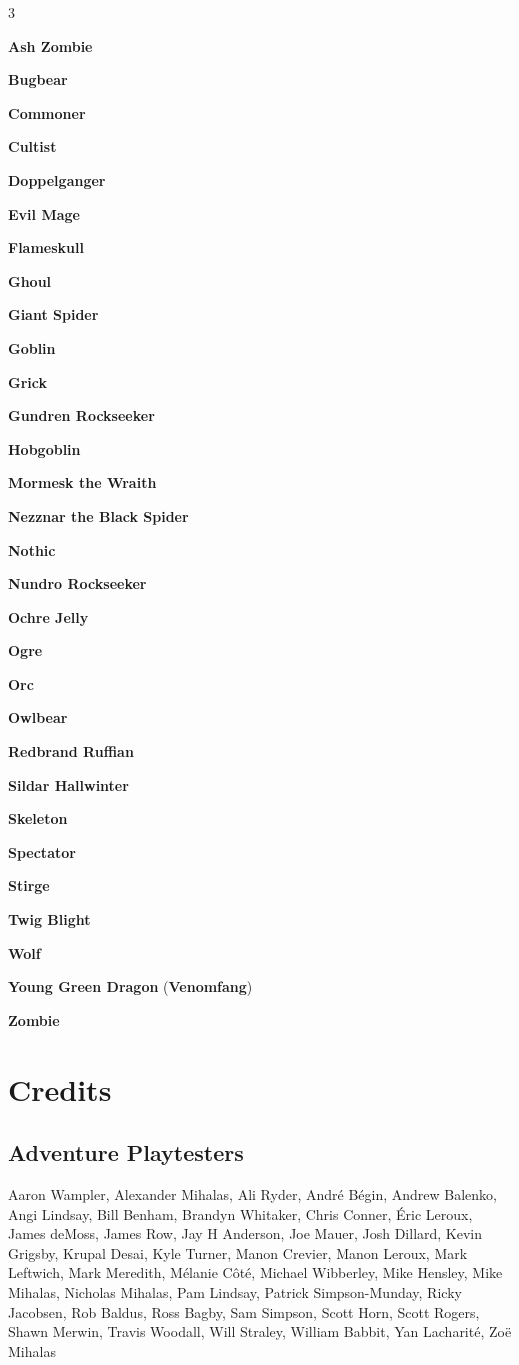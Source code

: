 \documentclass[10pt,a4paper,twoside,bg=print,twocolumn,openany,nodeprecatedcode]{dndbook}
\begin{document}
\begin{itemize}
\begin{multicols}{3}
\item \textbf{Ash Zombie}
\item \textbf{Bugbear}
\item \textbf{Commoner}
\item \textbf{Cultist}
\item \textbf{Doppelganger}
\item \textbf{Evil Mage}
\item \textbf{Flameskull}
\item \textbf{Ghoul}
\item \textbf{Giant Spider}
\item \textbf{Goblin}
\item \textbf{Grick}
\item \textbf{Gundren Rockseeker}
\item \textbf{Hobgoblin}
\item \textbf{Mormesk the Wraith}
\item \textbf{Nezznar the Black Spider}
\item \textbf{Nothic}
\item \textbf{Nundro Rockseeker}
\item \textbf{Ochre Jelly}
\item \textbf{Ogre}
\item \textbf{Orc}
\item \textbf{Owlbear}
\item \textbf{Redbrand Ruffian}
\item \textbf{Sildar Hallwinter}
\item \textbf{Skeleton}
\item \textbf{Spectator}
\item \textbf{Stirge}
\item \textbf{Twig Blight}
\item \textbf{Wolf}
\item \textbf{Young Green Dragon} (\textbf{Venomfang})
\item \textbf{Zombie}
\end{multicols}

\end{itemize}

\chapter{Credits}
\section{Adventure Playtesters}
Aaron Wampler, Alexander Mihalas, Ali Ryder, André Bégin, Andrew Balenko, Angi Lindsay, Bill Benham, Brandyn Whitaker, Chris Conner, Éric Leroux, James deMoss, James Row, Jay H Anderson, Joe Mauer, Josh Dillard, Kevin Grigsby, Krupal Desai, Kyle Turner, Manon Crevier, Manon Leroux, Mark Leftwich, Mark Meredith, Mélanie Côté, Michael Wibberley, Mike Hensley, Mike Mihalas, Nicholas Mihalas, Pam Lindsay, Patrick Simpson-Munday, Ricky Jacobsen, Rob Baldus, Ross Bagby, Sam Simpson, Scott Horn, Scott Rogers, Shawn Merwin, Travis Woodall, Will Straley, William Babbit, Yan Lacharité, Zoë Mihalas
\end{document}
